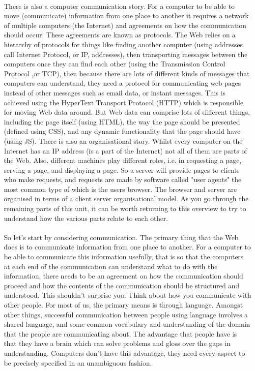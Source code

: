 \documentclass[12pt, a4paper, oneside]{book}
\begin{document}
\paragraph{} There is also a computer communication story. For a computer to be able to move (communicate) information from one place to another it requires a network of multiple computers (the Internet) and agreements on how the communication should occur. These agreements are known as protocols. The Web relies on a hierarchy of protocols for things like finding another computer (using addresses call Internet Protocol, or IP, addresses), then transporting messages between the computers once they can find each other (using the Transmission Control Protocol ,or TCP), then because there are lots of different kinds of messages that computers can understand, they need a protocol for communicating web pages instead of other messages such as email data, or instant messages. This is achieved using the HyperText Transport Protocol (HTTP) which is responsible for moving Web data around. But Web data can comprise lots of different things, including the page itself (using HTML), the way the page should be presented (defined using CSS), and any dynamic functionality that the page should have (using JS).
There is also an organisational story. Whilst every computer on the Internet has an IP address (is a part of the Internet) not all of them are parts of the Web. Also, different machines play different roles, i.e. in requesting a page, serving a page, and displaying a page. So a server will provide pages to clients who make requests, and requests are made by software called "user agents" the most common type of which is the users browser. The browser and server are organised in terms of a client server organisational model.
As you go through the remaining parts of this unit, it can be worth returning to this overview to try to understand how the various parts relate to each other.


\paragraph{} So let's start by considering communication. The primary thing that the Web does is to communicate information from one place to another. For a computer to be able to communicate this information usefully, that is so that the computers at each end of the communication can understand what to do with the information, there needs to be an agreement on how the communication should proceed and how the  contents of the communication should be structured and understood. This shouldn't surprise you. Think about how you communicate with other people. For most of us, the primary means is through language. Amongst other things, successful communication between people using language involves a shared language, and some common vocabulary and understanding of the domain that the people are communicating about. The advantage that people have is that they have a brain which can solve problems and gloss over the gaps in understanding. Computers don't have this advantage, they need every aspect to be precisely specified in an unambiguous fashion.
\end{document}
